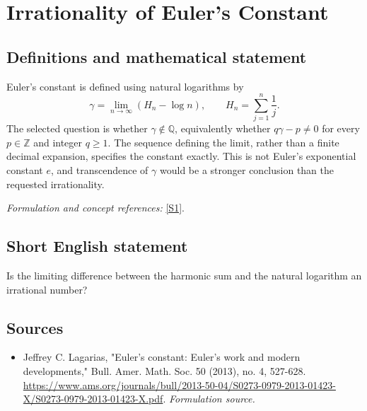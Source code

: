 \documentclass[11pt]{article}
\begin{document}
\section*{\texorpdfstring{Irrationality of Euler's Constant}{Irrationality of Euler's Constant}}\label{statement}
\subsection{Definitions and mathematical statement}
Euler's constant is defined using natural logarithms by
\[
 \gamma=\lim_{n\to\infty}\left(H_n-\log n\right),
 \qquad H_n=\sum_{j=1}^n\frac1j.
\]
The selected question is whether $\gamma\notin{\mathbb{Q}}$, equivalently whether
$q\gamma-p\ne0$ for every $p\in{\mathbb{Z}}$ and integer $q\ge1$. The sequence defining the limit, rather than a finite decimal expansion, specifies the constant exactly. This is not Euler's exponential constant $e$, and transcendence of $\gamma$ would be a stronger conclusion than the requested irrationality.
\par\smallskip\textit{Formulation and concept references:} \href{https://www.ams.org/journals/bull/2013-50-04/S0273-0979-2013-01423-X/S0273-0979-2013-01423-X.pdf}{[S1]}.

\subsection{Short English statement}
Is the limiting difference between the harmonic sum and the natural logarithm an irrational number?
\subsection{Sources}
\begin{itemize}
\item[S1]Jeffrey C. Lagarias, "Euler's constant: Euler's work and modern developments," Bull. Amer. Math. Soc. 50 (2013), no. 4, 527-628.
\url{https://www.ams.org/journals/bull/2013-50-04/S0273-0979-2013-01423-X/S0273-0979-2013-01423-X.pdf}.
\textit{Formulation source.}
\end{itemize}
\end{document}

